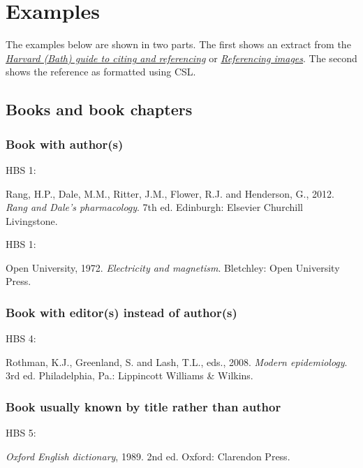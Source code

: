 \section{Examples}

The examples below are shown in two parts.
The first shows an extract from the
\href{http://www.bath.ac.uk/library/infoskills/referencing-plagiarism/harvard-bath-style.html}{\emph{Harvard (Bath) guide to citing and referencing}} or
\href{http://www.bath.ac.uk/library/pass.bho/images-referencing.pdf}{\emph{Referencing images}}.
The second shows the reference as formatted using CSL.

\subsection{Books and book chapters}

\subsubsection*{Book with author(s)}

HBS 1: \cite{rang.etal2012rdp}

Rang, H.P., Dale, M.M., Ritter, J.M., Flower, R.J. and Henderson, G., 2012. \emph{Rang and Dale's pharmacology}. 7th ed. Edinburgh: Elsevier Churchill Livingstone.


HBS 1: \cite{ou1972em}

Open University, 1972. \emph{Electricity and magnetism}. Bletchley: Open University Press.



\subsubsection*{Book with editor(s) instead of author(s)}

HBS 4: \cite{rothman.etal2008me}

Rothman, K.J., Greenland, S. and Lash, T.L., eds., 2008. \emph{Modern epidemiology}. 3rd ed. Philadelphia, Pa.: Lippincott Williams \& Wilkins.



\subsubsection*{Book usually known by title rather than author}

HBS 5: \cite{oed1989}

\emph{Oxford English dictionary}, 1989. 2nd ed. Oxford: Clarendon Press.


